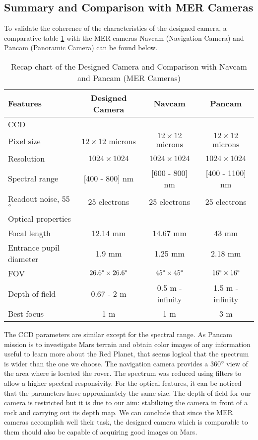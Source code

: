 \subsection{Summary and Comparison with MER Cameras}
To validate the coherence of the characteristics of the designed camera, a comparative table \ref{tabCameras} with the MER cameras Navcam (Navigation Camera) and Pancam (Panoramic Camera) \cite{merengineeringcameras} can be found below.

\begin{table}[H]
\centering
\caption{Recap chart of the Designed Camera and Comparison with Navcam and Pancam (MER Cameras)}
\label{tabCameras}
\renewcommand{\arraystretch}{1.5}
\begin{tabular}{|l|c c c|}
\hline
Features & Designed Camera & Navcam & Pancam \\
\hline
CCD &  &  &  \\
Pixel size & $12 \times 12 $ microns & $12 \times 12 $ microns & $12 \times 12 $ microns \\ 
Resolution & $1024 \times 1024 $ & $1024 \times 1024 $ & $1024 \times 1024 $ \\ 
Spectral range & [400 - 800] nm & [600 - 800] nm & [400 - 1100] nm \\ 
Readout noise, 55$\degree$ & 25 electrons & 25 electrons & 25 electrons \\
\hline
Optical properties & & &  \\
Focal length & 12.14 mm & 14.67 mm & 43 mm  \\
Entrance pupil diameter & 1.9 mm & 1.25 mm & 2.18 mm  \\
FOV & $26.6 \degree \times 26.6\degree$ & $45 \degree \times 45\degree$ & $16 \degree \times 16\degree$ \\
Depth of field & 0.67 - 2 m & 0.5 m - infinity & 1.5 m - infinity \\ 
Best focus & 1 m & 1 m & 3 m \\
\hline
\end{tabular}
\end{table}

The CCD parameters are similar except for the spectral range. As Pancam mission is to investigate Mars terrain and obtain color images of any information useful to learn more about the Red Planet, that seems logical that the spectrum is wider than the one we choose. The navigation camera provides a 360$\degree$ view of the area where is located the rover. The spectrum was reduced using filters to allow a higher spectral responsivity.
For the optical features, it can be noticed that the parameters have approximately the same size. The depth of field for our camera is restricted but it is due to our aim: stabilizing the camera in front of a rock and carrying out its depth map.
We can conclude that since the MER cameras accomplish well their task, the designed camera which is comparable to them should also be capable of acquiring good images on Mars.


